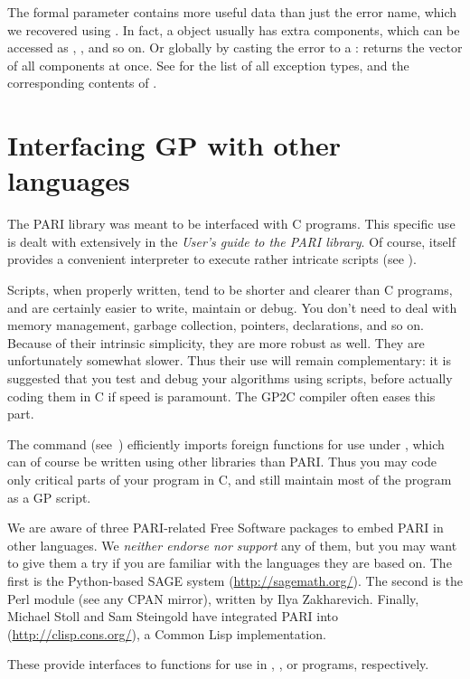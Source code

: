 The  formal parameter contains more useful data than just the error
name, which we recovered using . In fact, a 
object usually has extra components, which can be accessed as
, , and so on. Or globally by
casting the error to a :  returns the vector
of all components at once. See  for the list of all
exception types, and the corresponding contents of .

\section{Interfacing GP with other languages}
\noindent
The PARI library was meant to be interfaced with C programs. This specific
use is dealt with extensively in the \emph{User's guide to the PARI library}.
Of course,  itself provides a convenient  interpreter to execute
rather intricate scripts (see ).

Scripts, when properly written, tend to be shorter and clearer than C
programs, and are certainly easier to write, maintain or debug. You don't
need to deal with memory management, garbage collection, pointers,
declarations, and so on. Because of their intrinsic simplicity, they are more
robust as well. They are unfortunately somewhat slower. Thus their use will
remain complementary: it is suggested that you test and debug your algorithms
using scripts, before actually coding them in C if speed is paramount.
The GP2C compiler often eases this part.

The  command (see~) efficiently imports
foreign functions for use under , which can of course be written
using other libraries than PARI. Thus you may code only critical parts
of your program in C, and still maintain most of the program as a GP script.

We are aware of three PARI-related Free Software packages to embed PARI in
other languages. We \emph{neither endorse nor support} any of them, but you
may want to give them a try if you are familiar with the languages they are
based on. The first is the Python-based SAGE
system (\url{http://sagemath.org/}). The second is the  Perl
module (see any CPAN mirror), written by Ilya Zakharevich.
Finally, Michael Stoll and Sam Steingold have integrated PARI into 
(\url{http://clisp.cons.org/}), a Common Lisp implementation.

These provide interfaces to  functions for use in
, , or 
programs, respectively.

